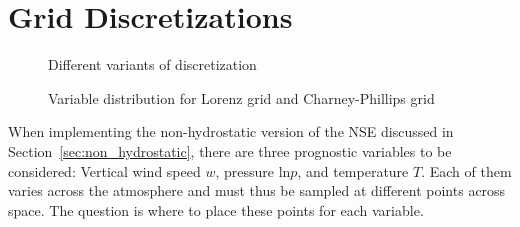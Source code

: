 \section{Grid Discretizations}\label{sec:grid_discretization}
\begin{figure}[ht]
    \caption{Different variants of discretization}
    \label{fig:grid_discretization}
\end{figure}
\begin{figure}[ht]
    \caption{Variable distribution for Lorenz grid and Charney-Phillips grid}
    \label{fig:lorenz_cp}
\end{figure}
\noindent
When implementing the non-hydrostatic version of the NSE discussed in Section~\ref{sec:non_hydrostatic}, there are three prognostic variables to be considered: Vertical wind speed $w$, pressure $\text{ln}p$, and temperature $T$.
Each of them varies across the atmosphere and must thus be sampled at different points across space.
The question is where to place these points for each variable.

